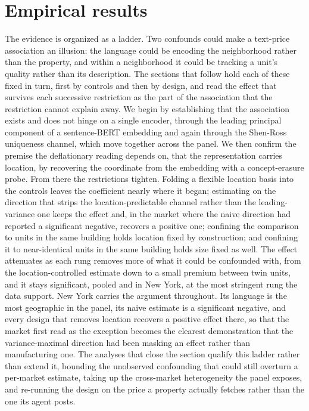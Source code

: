 \documentclass{article}
\begin{document}
\section{Empirical results}
\label{sec:results}

The evidence is organized as a ladder. Two confounds could make a text-price
association an illusion: the language could be encoding the neighborhood rather than
the property, and within a neighborhood it could be tracking a unit's quality rather
than its description. The sections that follow hold each of these fixed in turn,
first by controls and then by design, and read the effect that survives each
successive restriction as the part of the association that the restriction cannot
explain away. We begin by establishing that the association exists and does not
hinge on a single encoder, through the leading principal component of a
sentence-BERT embedding and again through the Shen-Ross uniqueness channel, which
move together across the panel. We then confirm the premise the deflationary reading
depends on, that the representation carries location, by recovering the coordinate
from the embedding with a concept-erasure probe. From there the restrictions
tighten. Folding a flexible location basis into the controls leaves the coefficient
nearly where it began; estimating on the direction that strips the
location-predictable channel rather than the leading-variance one keeps the effect
and, in the market where the naive direction had reported a significant negative, recovers a positive one;
confining the comparison to units in the same building holds location fixed by
construction; and confining it to near-identical units in the same building holds
size fixed as well. The effect attenuates as each rung removes more of what it could
be confounded with, from the location-controlled estimate down to a small premium
between twin units, and it stays significant, pooled and in New York, at the most
stringent rung the data support. New York carries the argument throughout. Its
language is the most geographic in the panel, its naive estimate is a significant negative, and
every design that removes location recovers a positive effect there, so that the
market first read as the exception becomes the clearest demonstration that the
variance-maximal direction had been masking an effect rather than manufacturing
one. The analyses that close the section qualify this ladder rather than extend it,
bounding the unobserved confounding that could still overturn a per-market estimate,
taking up the cross-market heterogeneity the panel exposes, and re-running the design
on the price a property actually fetches rather than the one its agent posts.
\end{document}
